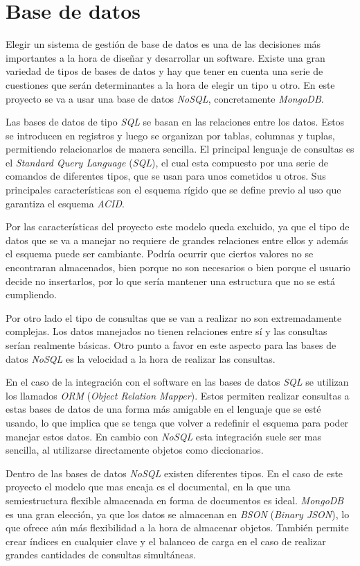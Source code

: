 \section{Base de datos}


Elegir un sistema de gestión de base de datos es una de las decisiones más importantes a la hora de diseñar y desarrollar un software. Existe una gran variedad de tipos de bases de datos y hay que tener en cuenta una serie de cuestiones que serán determinantes a la hora de elegir un tipo u otro. En este proyecto se va a usar una base de datos \textit{NoSQL}, concretamente \textit{MongoDB}.

Las bases de datos de tipo \textit{SQL} se basan en las relaciones entre los datos. Estos se introducen en registros y luego se organizan por tablas, columnas y tuplas, permitiendo relacionarlos de manera sencilla. El principal lenguaje de consultas es el \textit{Standard Query Language} (\textit{SQL}), el cual esta compuesto por una serie de comandos de diferentes tipos, que se usan para unos cometidos u otros. Sus principales características son el esquema rígido que se define previo al uso que garantiza el esquema \textit{ACID}.

Por las características del proyecto este modelo queda excluido, ya que el tipo de datos que se va a manejar no requiere de grandes relaciones entre ellos y además el esquema puede ser cambiante. Podría ocurrir que ciertos valores no se encontraran almacenados, bien porque no son necesarios o bien porque el usuario decide no insertarlos, por lo que sería mantener una estructura que no se está cumpliendo.

Por otro lado el tipo de consultas que se van a realizar no son extremadamente complejas. Los datos manejados no tienen relaciones entre sí y las consultas serían realmente básicas. Otro punto a favor en este aspecto para las bases de datos \textit{NoSQL} es la velocidad a la hora de realizar las consultas.

En el caso de la integración con el software en las bases de datos \textit{SQL} se utilizan los llamados \textit{ORM} (\textit{Object Relation Mapper}). Estos permiten realizar consultas a estas bases de datos de una forma más amigable en el lenguaje que se esté usando, lo que implica que se tenga que volver a redefinir el esquema para poder manejar estos datos. En cambio con \textit{NoSQL} esta integración suele ser mas sencilla, al utilizarse directamente objetos como diccionarios.

Dentro de las bases de datos \textit{NoSQL} existen diferentes tipos. En el caso de este proyecto el modelo que mas encaja es el documental, en la que una semiestructura flexible almacenada en forma de documentos es ideal. \textit{MongoDB} es una gran elección, ya que los datos se almacenan en \textit{BSON} (\textit{Binary JSON}), lo que ofrece aún más flexibilidad a la hora de almacenar objetos. También permite crear índices en cualquier clave y el balanceo de carga en el caso de realizar grandes cantidades de consultas simultáneas.

